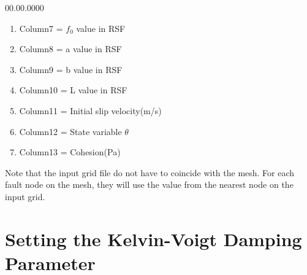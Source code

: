 \begin{lyxlist}{00.00.0000}
\begin{enumerate}
  \item{Column7} = $f_0$ value in RSF

  \item{Column8} = a value in RSF

  \item{Column9} = b value in RSF

  \item{Column10} = L value in RSF

  \item{Column11} = Initial slip velocity(m/s)

  \item{Column12} = State variable $\theta$

  \item{Column13} = Cohesion(Pa)
  \end{enumerate}
  Note that the input grid file do not have to coincide with the mesh. For each fault node on the mesh, they will use the value from the nearest node on the input grid.
\end{lyxlist}


\section{Setting the Kelvin-Voigt Damping Parameter}\label{sec:Setting-the-Kelvin-Voigt}

